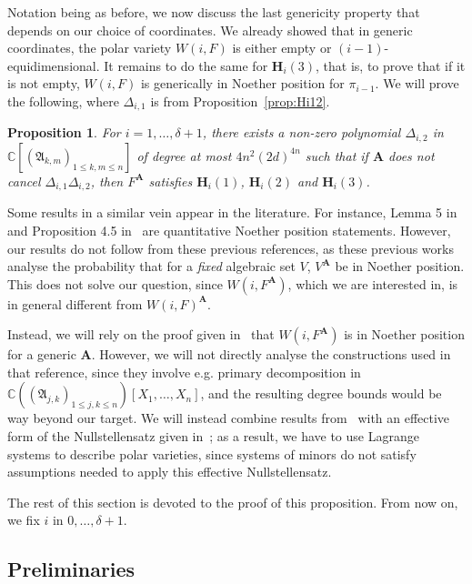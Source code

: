 \documentclass[12pt]{article}
\def\A{\mathfrak{A}}
\def\mA{{\bm A}}
\def\D{\Delta}
\def\C{\mathbb{C}}
\newtheorem{prop}[theorem]{Proposition}
\begin{document}
Notation being as before, we now discuss the last genericity property
that depends on our choice of coordinates. We already showed that in
generic coordinates, the polar variety $W(i, F)$ is either empty or
$(i-1)$-equidimensional. It remains to do the same for $\bm H_i(3)$, 
that is, to prove that if it is not empty, $W(i, F)$ is generically in Noether
position for $\pi_{i-1}$. We will prove the following, where $\D_{i,1}$ is
from Proposition~\ref{prop:Hi12}.
\begin{prop}\label{prop:Hi123}
  For $i=1,\dots,\delta+1$, there exists a non-zero polynomial 
  $\D_{i,2}$ in $\C[(\A_{k,m})_{1 \le k,m \le n}]$ of degree at most
  $4n^2(2d)^{4n}$ such that if $\mA$ does not cancel $\D_{i,1}
  \D_{i,2}$, then $F^{\mA}$ satisfies $\bm H_i(1)$, $\bm H_i(2)$ and
  $\bm H_i(3)$.
\end{prop}
Some results in a similar vein appear in the literature. For instance,
Lemma 5 in~\cite{JeSa10} and Proposition 4.5
in~\cite{SharpEstimatesForTheEffectiveN} are quantitative Noether
position statements. However, our results do not follow from these
previous references, as these previous works analyse the probability
that for a {\em fixed} algebraic set $V$, $V^\mA$ be in Noether
position.  This does not solve our question, since
$W(i,F^\mA)$, which we are interested in, is in general
different from $W(i,F)^\mA$.

Instead, we will rely on the proof given in~\cite{EMP} that
$W(i,F^\mA)$ is in Noether position for a generic $\mA$.  However,
we will not directly analyse the constructions used in that reference,
since they involve e.g. primary decomposition in $\C((\A_{j,k})_{1 \le
  j,k \le n})[X_1,\dots,X_n]$, and the resulting degree bounds would
be way beyond our target. We will instead combine results
from~\cite{EMP} with an effective form of the Nullstellensatz given
in~\cite{EN}; as a result, we have to use Lagrange systems to
describe polar varieties, since systems of minors do not satisfy
assumptions needed to apply this effective Nullstellensatz.
 
The rest of this section is devoted to the proof of this proposition.
From now on, we fix $i$ in $0,\dots,\delta+1$.


\subsection{Preliminaries}
\end{document}
